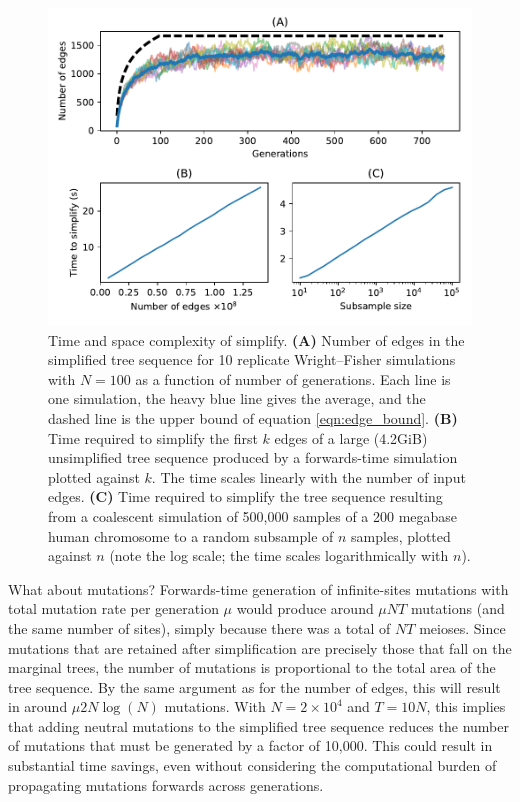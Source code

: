 \documentclass{article}
\begin{document}
\begin{figure}
    \begin{center}
        \includegraphics{sims/simplify-results}
    \end{center}
    \caption{
        Time and space complexity of simplify.
        \textbf{(A)}
        Number of edges in the simplified tree sequence
        for 10 replicate Wright--Fisher simulations with $N=100$ as a function
        of number of generations.
        Each line is one simulation, the heavy blue line gives the average,
        and the dashed line is the upper bound of equation \eqref{eqn:edge_bound}.
        \textbf{(B)}
        Time required to simplify the first $k$ edges of a large (4.2GiB)
        unsimplified tree sequence produced by a forwards-time simulation plotted
        against $k$. The time scales linearly with the number of input edges.
        \textbf{(C)}
        Time required to simplify the tree sequence resulting from a coalescent
        simulation of 500,000 samples of a 200 megabase human chromosome
        to a random subsample of $n$ samples, plotted against $n$
        (note the log scale; the time scales logarithmically with $n$).
        \label{fig:simplify_complexity}
    }
\end{figure}

What about mutations?
Forwards-time generation of infinite-sites mutations with total mutation rate per generation $\mu$
would produce around $\mu N T$ mutations (and the same number of sites),
simply because there was a total of $N T$ meioses.
Since mutations that are retained after simplification
are precisely those that fall on the marginal trees,
the number of mutations is proportional to the total area of the tree sequence.
By the same argument as for the number of edges,
this will result in around $\mu 2 N \log(N)$ mutations.
With $N=2 \times 10^4$ and $T=10N$,
this implies that adding neutral mutations
to the simplified tree sequence reduces the number of mutations that must be generated
by a factor of 10,000.
This could result in substantial time savings,
even without considering the
computational burden of propagating mutations forwards across generations.
\end{document}
